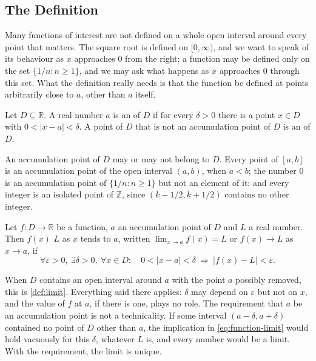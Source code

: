 \subsection{The Definition}

Many functions of interest are not defined on a whole open interval around every point that matters. The square root is defined on $[0,\infty)$, and we want to speak of its behaviour as $x$ approaches $0$ from the right; a function may be defined only on the set $\{1/n: n\ge1\}$, and we may ask what happens as $x$ approaches $0$ through this set. What the definition really needs is that the function be defined at points arbitrarily close to $a$, other than $a$ itself.

\begin{definition}
\label{def:accumulation}
Let $D\subseteq\mathbb R$. A real number $a$ is an  of $D$ if for every $\delta>0$ there is a point $x\in D$ with $0<|x-a|<\delta$. A point of $D$ that is not an accumulation point of $D$ is an  of $D$.
\end{definition}

An accumulation point of $D$ may or may not belong to $D$. Every point of $[a,b]$ is an accumulation point of the open interval $(a,b)$, when $a<b$; the number $0$ is an accumulation point of $\{1/n: n\ge1\}$ but not an element of it; and every integer is an isolated point of $\mathbb Z$, since $(k-1/2,k+1/2)$ contains no other integer.

\begin{definition}
\label{def:function-limit}
Let $f\colon D\to\mathbb R$ be a function, $a$ an accumulation point of $D$ and $L$ a real number. Then $f(x)$  $L$ as $x$ tends to $a$, written $\lim_{x\to a}f(x)=L$ or $f(x)\to L$ as $x\to a$, if
\begin{equation}
\forall\varepsilon>0,\ \exists\delta>0,\ \forall x\in D:\quad0<|x-a|<\delta\ \Rightarrow\ |f(x)-L|<\varepsilon .
\label{eq:function-limit}
\end{equation}
\end{definition}

When $D$ contains an open interval around $a$ with the point $a$ possibly removed, this is \cref{def:limit}. Everything said there applies: $\delta$ may depend on $\varepsilon$ but not on $x$, and the value of $f$ at $a$, if there is one, plays no role. The requirement that $a$ be an accumulation point is not a technicality. If some interval $(a-\delta,a+\delta)$ contained no point of $D$ other than $a$, the implication in \eqref{eq:function-limit} would hold vacuously for this $\delta$, whatever $L$ is, and every number would be a limit. With the requirement, the limit is unique.

